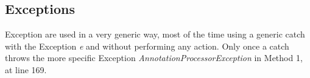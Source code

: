 \subsection{Exceptions}

Exception are used in a very generic way, most of the time using a generic catch with the Exception \textit{e} and without performing any action.\newline
Only once a catch throws the more specific Exception \textit{AnnotationProcessorException} in Method 1, at line 169.